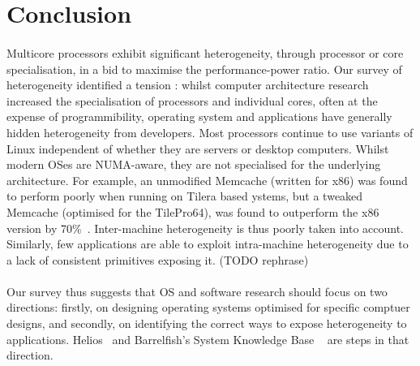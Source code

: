 \section{Conclusion}

\paragraph{}Multicore processors exhibit significant heterogeneity, through processor or core specialisation, in a bid
to maximise the performance-power ratio. Our 
survey of heterogeneity identified a tension :
whilst computer architecture research increased
the specialisation of processors and individual cores,
often at the expense of programmibility, 
operating system and applications have generally 
hidden heterogeneity from developers. Most processors 
continue to use variants of Linux independent of
whether they are servers or desktop computers. 
Whilst modern OSes are NUMA-aware, they are not specialised for the underlying architecture.
For example, an unmodified Memcache (written for x86) was found to perform poorly when 
running on Tilera based ystems, but a tweaked Memcache (optimised for the TilePro64), 
was found to outperform the x86 version by 70\%~\cite{berezecki2011manycore}.
Inter-machine heterogeneity is thus poorly taken into account. Similarly, 
few applications are able to exploit intra-machine
heterogeneity due to a lack of consistent primitives exposing it. (TODO rephrase)


\paragraph{} Our survey thus suggests that OS and software research should focus on two directions:
firstly, on designing operating systems
optimised for specific comptuer designs, and secondly, 
on identifying the correct ways to expose heterogeneity
to applications. Helios~\cite{nightingale2009helios} and Barrelfish's System Knowledge Base ~\cite{schupbach08embracingdiversity} are steps in that direction. 


